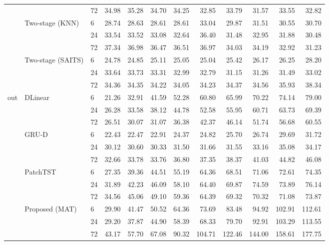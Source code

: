 \begin{table}
\begin{tabular}{lllrrrrrrrrr}
 &  & 72 & 34.98 & 35.28 & 34.70 & 34.25 & 32.85 & 33.79 & 31.57 & 33.55 & 32.82 \\
\cline{2-12}
 & \multirow[t]{3}{*}{Two-stage (KNN)} & 6 & 28.74 & 28.63 & 28.61 & 28.61 & 33.04 & 29.87 & 31.51 & 30.55 & 30.70 \\
 &  & 24 & 33.54 & 33.52 & 33.08 & 32.64 & 36.40 & 31.48 & 32.95 & 31.88 & 30.48 \\
 &  & 72 & 37.34 & 36.98 & 36.47 & 36.51 & 36.97 & 34.03 & 34.19 & 32.92 & 31.23 \\
\cline{2-12}
 & \multirow[t]{3}{*}{Two-stage (SAITS)} & 6 & 24.78 & 24.85 & 25.11 & 25.05 & 25.04 & 25.42 & 26.17 & 26.25 & 28.20 \\
 &  & 24 & 33.64 & 33.73 & 33.31 & 32.99 & 32.79 & 31.15 & 31.26 & 31.49 & 33.02 \\
 &  & 72 & 34.36 & 34.35 & 34.22 & 34.05 & 34.23 & 34.37 & 34.56 & 35.93 & 38.34 \\
\cline{1-12} \cline{2-12}
\multirow[t]{21}{*}{out} & \multirow[t]{3}{*}{DLinear} & 6 & 21.26 & 32.91 & 41.59 & 52.28 & 60.80 & 65.99 & 70.22 & 74.14 & 79.00 \\
 &  & 24 & 26.28 & 33.58 & 38.12 & 44.78 & 52.58 & 55.95 & 60.71 & 63.73 & 69.39 \\
 &  & 72 & 26.51 & 30.07 & 31.07 & 36.38 & 42.37 & 46.14 & 51.74 & 56.68 & 60.55 \\
\cline{2-12}
 & \multirow[t]{3}{*}{GRU-D} & 6 & 22.43 & 22.47 & 22.91 & 24.37 & 24.82 & 25.70 & 26.74 & 29.69 & 31.72 \\
 &  & 24 & 30.12 & 30.60 & 30.33 & 31.50 & 31.66 & 31.55 & 33.16 & 35.08 & 34.17 \\
 &  & 72 & 32.66 & 33.78 & 33.76 & 36.80 & 37.35 & 38.37 & 41.03 & 44.82 & 46.08 \\
\cline{2-12}
 & \multirow[t]{3}{*}{PatchTST} & 6 & 27.35 & 39.36 & 44.51 & 55.19 & 64.36 & 68.51 & 71.06 & 72.61 & 74.35 \\
 &  & 24 & 31.89 & 42.23 & 46.09 & 58.10 & 64.40 & 69.87 & 74.59 & 73.89 & 76.14 \\
 &  & 72 & 34.56 & 45.06 & 49.10 & 59.36 & 64.39 & 69.32 & 70.32 & 71.08 & 73.87 \\
\cline{2-12}
 & \multirow[t]{3}{*}{Proposed (MAT)} & 6 & 29.90 & 41.47 & 50.52 & 64.36 & 73.69 & 83.48 & 94.92 & 102.91 & 112.61 \\
 &  & 24 & 29.20 & 37.87 & 44.90 & 58.39 & 68.33 & 79.70 & 92.91 & 103.29 & 113.55 \\
 &  & 72 & 43.17 & 57.70 & 67.08 & 90.32 & 104.71 & 122.46 & 144.00 & 158.61 & 177.75 \\

\end{tabular}
\end{table}
